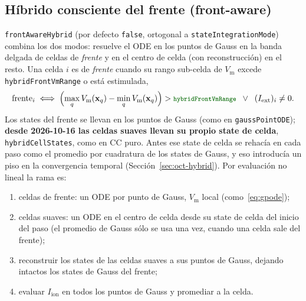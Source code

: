 \documentclass[11pt,a4paper]{article}
\newcommand{\code}[1]{\texttt{\small #1}}
\newcommand{\Vm}{V_{\text{m}}}
\newcommand{\Iion}{I_{\mathrm{ion}}}
\newcommand{\Iext}{I_{\mathrm{ext}}}
\newcommand{\dictkey}[1]{\textcolor{black!60!green}{\texttt{\footnotesize #1}}}
\begin{document}
\subsection{Híbrido consciente del frente (front-aware)}
\label{sec:hybrid}

\dictkey{frontAwareHybrid} (por defecto \code{false}, ortogonal a
\dictkey{stateIntegrationMode}) combina los dos modos: resuelve el ODE
en los puntos de Gauss en la banda delgada de celdas de \emph{frente} y en el
centro de celda (con reconstrucción) en el resto. Una celda $i$ es de \emph{frente}
cuando su rango sub-celda de $\Vm$ excede \dictkey{hybridFrontVmRange} o está
estimulada,
\begin{equation}
  \text{frente}_i \;\Longleftrightarrow\;
  \Bigl(\max_q\Vm(\mathbf{x}_q)-\min_q\Vm(\mathbf{x}_q)\Bigr)
     > \dictkey{hybridFrontVmRange}
  \;\;\vee\;\; (\Iext)_i\neq 0 .
  \label{eq:frontflag}
\end{equation}
Los states del frente se llevan en los puntos de Gauss (como en
\code{gaussPointODE}); \textbf{desde 2026-10-16 las celdas suaves llevan su propio
state de celda}, \code{hybridCellStates}, como en CC puro. Antes ese state de celda
se rehacía en cada paso como el promedio por cuadratura de los states de Gauss, y
eso introducía un piso en la convergencia temporal
(Sección~\ref{sec:oct-hybrid}). Por evaluación no lineal la rama es:
\begin{enumerate}[topsep=2pt,itemsep=1pt,label=(\alph*)]
  \item celdas de frente: un ODE por punto de Gauss, $\Vm$ local (como~\eqref{eq:gpode});
  \item celdas suaves: un ODE en el centro de celda desde su state de celda del
        inicio del paso (el promedio de Gauss sólo se usa una vez, cuando una celda
        sale del frente);
  \item reconstruir los states de las celdas suaves a sus puntos de Gauss, dejando
        intactos los states de Gauss del frente;
  \item evaluar $\Iion$ en todos los puntos de Gauss y promediar a la celda.
\end{enumerate}
\end{document}
